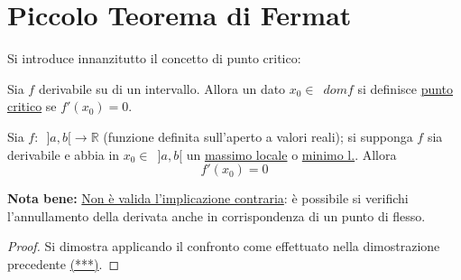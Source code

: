 \documentclass[10pt, oneside]{book}
\theoremstyle{plain}
\begin{document}
\section{Piccolo Teorema di Fermat}
Si introduce innanzitutto il concetto di punto critico:
\begin{defin}
\label{critico}
Sia $f$ derivabile su di un intervallo. Allora un dato $x_0 \in \enspace dom f$ si definisce \underline{punto critico} se $f'(x_0) = 0$.
\end{defin}

\begin{ther}
Sia $f: \enspace ]a, b[ \rightarrow \mathbb{R}$ (funzione definita sull'aperto a valori reali); si supponga $f$ sia derivabile e abbia in $x_0 \in \enspace ]a, b[$ un \underline{massimo locale} o \underline{minimo l.}. Allora \[f'(x_0) = 0\]
\end{ther}
\textbf{Nota bene:} \underline{Non è valida l'implicazione contraria}: è possibile si verifichi l'annullamento della derivata anche in corrispondenza di un punto di flesso.
\begin{proof}
Si dimostra applicando il confronto come effettuato nella dimostrazione precedente \hyperlink{confr}{(***)}.
\end{proof}
\end{document}
